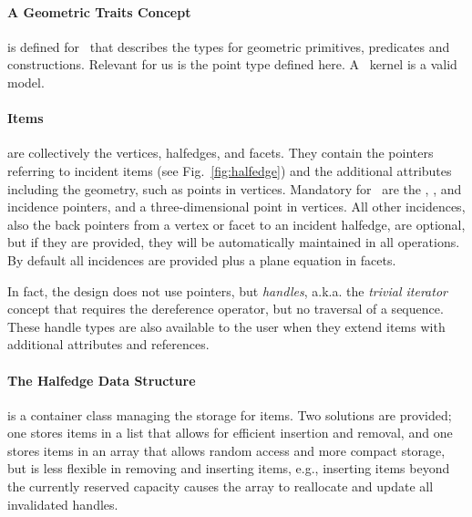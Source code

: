 \label{sec:poly}


\paragraph*{A Geometric Traits Concept} is defined for \cgalpoly\ that
describes the types for geometric primitives, predicates and
constructions. Relevant for us is the point type defined here. A
\cgal\ kernel is a valid model.

\paragraph*{Items}  are collectively the  vertices, halfedges, and
facets. They contain the pointers referring to incident items (see
Fig.~\ref{fig:halfedge}) and the additional attributes including the
geometry, such as points in vertices. Mandatory for \cgalpoly\ are the
, , and  incidence
pointers, and a three-dimensional point in vertices. All other
incidences, also the back pointers from a vertex or facet to an
incident halfedge, are optional, but if they are provided, they will
be automatically maintained in all operations. By default all
incidences are provided plus a plane equation in facets.

In fact, the design does not use pointers, but %
\emph{handles}, a.k.a. the \emph{trivial iterator\/} concept that
requires the dereference operator, but no traversal of a sequence.
These handle types are also available to the user when they extend items
with additional attributes and references.

\paragraph*{The Halfedge Data Structure} is a container class managing
the storage for items. Two solutions are provided; one stores items in
a list that allows for efficient insertion and removal, and one
stores items in an array that allows random access and more compact
storage, but is less flexible in removing and inserting items, e.g.,
inserting items beyond the currently reserved capacity causes the
array to reallocate and update all invalidated handles.

